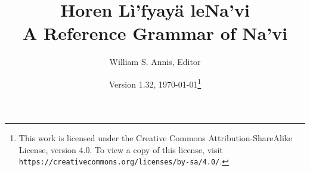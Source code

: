 \documentclass[12pt,oneside]{book}
\begin{document}
\frenchspacing

\title{Horen Lì'fyayä leNa'vi\\A Reference Grammar of Na'vi}
\author{William S. Annis, Editor}
\date{Version 1.32, \today\footnote{This work is licensed
    under the Creative Commons Attribution-ShareAlike License, version
    4.0.  To view a copy of this license, visit 
    \texttt{https://creativecommons.org/licenses/by-sa/4.0/}.}}
\maketitle

\setcounter{tocdepth}{2}
\begin{multicols}{2}
\tableofcontents
\end{multicols}










\appendix
{\small \printindex}


\end{document}
